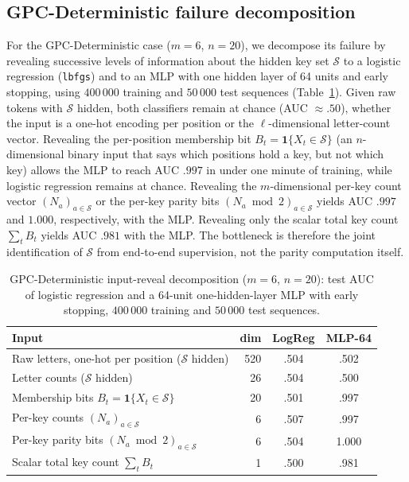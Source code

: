 \documentclass{article} %
\theoremstyle{plain}
\theoremstyle{definition}
\theoremstyle{remark}
\begin{document}
\subsection{GPC-Deterministic failure decomposition}
\label{appendix:parity_decomp}
For the GPC-Deterministic case ($m=6$, $n=20$), we decompose its failure by revealing successive levels of information about the hidden key set $\mathcal{S}$ to a logistic regression (\texttt{lbfgs}) and to an MLP with one hidden layer of 64 units and early stopping, using $400\,000$ training and $50\,000$ test sequences (Table~\ref{tab:parity_decomp}). Given raw tokens with $\mathcal{S}$ hidden, both classifiers remain at chance (AUC $\approx .50$), whether the input is a one-hot encoding per position or the $\ell$-dimensional letter-count vector. Revealing the per-position membership bit $B_t = \mathbf{1}\{X_t \in \mathcal{S}\}$ (an $n$-dimensional binary input that says which positions hold a key, but not which key) allows the MLP to reach AUC $.997$ in under one minute of training, while logistic regression remains at chance. Revealing the $m$-dimensional per-key count vector $(N_a)_{a\in\mathcal{S}}$ or the per-key parity bits $(N_a \bmod 2)_{a\in\mathcal{S}}$ yields AUC $.997$ and $1.000$, respectively, with the MLP. Revealing only the scalar total key count $\sum_t B_t$ yields AUC $.981$ with the MLP. The bottleneck is therefore the joint identification of $\mathcal{S}$ from end-to-end supervision, not the parity computation itself.

\begin{table}[h]
\centering\small
\caption{GPC-Deterministic input-reveal decomposition ($m=6$, $n=20$): test AUC of logistic regression and a 64-unit one-hidden-layer MLP with early stopping, $400\,000$ training and $50\,000$ test sequences.}
\label{tab:parity_decomp}
\begin{tabular}{@{}lrcc@{}}
\toprule
Input & dim & LogReg & MLP-64 \\
\midrule
Raw letters, one-hot per position ($\mathcal{S}$ hidden) & 520 & .504 & .502 \\
Letter counts ($\mathcal{S}$ hidden) & 26 & .504 & .500 \\
Membership bits $B_t=\mathbf{1}\{X_t\in\mathcal{S}\}$ & 20 & .501 & .997 \\
Per-key counts $(N_a)_{a\in\mathcal{S}}$ & 6 & .507 & .997 \\
Per-key parity bits $(N_a \bmod 2)_{a\in\mathcal{S}}$ & 6 & .504 & 1.000 \\
Scalar total key count $\sum_t B_t$ & 1 & .500 & .981 \\
\bottomrule
\end{tabular}
\end{table}
\end{document}
